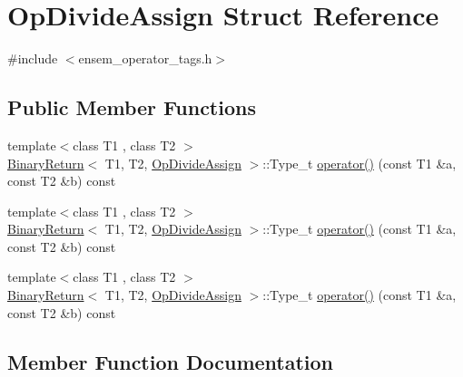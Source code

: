 \hypertarget{structOpDivideAssign}{}\section{Op\+Divide\+Assign Struct Reference}
\label{structOpDivideAssign}


{\ttfamily \#include $<$ensem\+\_\+operator\+\_\+tags.\+h$>$}

\subsection*{Public Member Functions}
\begin{DoxyCompactItemize}
\item 
{\footnotesize template$<$class T1 , class T2 $>$ }\\\mbox{\hyperlink{structBinaryReturn}{Binary\+Return}}$<$ T1, T2, \mbox{\hyperlink{structOpDivideAssign}{Op\+Divide\+Assign}} $>$\+::Type\+\_\+t \mbox{\hyperlink{structOpDivideAssign_a805531d103a9b37b9eb9ff4debaf5e41}{operator()}} (const T1 \&a, const T2 \&b) const
\item 
{\footnotesize template$<$class T1 , class T2 $>$ }\\\mbox{\hyperlink{structBinaryReturn}{Binary\+Return}}$<$ T1, T2, \mbox{\hyperlink{structOpDivideAssign}{Op\+Divide\+Assign}} $>$\+::Type\+\_\+t \mbox{\hyperlink{structOpDivideAssign_a805531d103a9b37b9eb9ff4debaf5e41}{operator()}} (const T1 \&a, const T2 \&b) const
\item 
{\footnotesize template$<$class T1 , class T2 $>$ }\\\mbox{\hyperlink{structBinaryReturn}{Binary\+Return}}$<$ T1, T2, \mbox{\hyperlink{structOpDivideAssign}{Op\+Divide\+Assign}} $>$\+::Type\+\_\+t \mbox{\hyperlink{structOpDivideAssign_a805531d103a9b37b9eb9ff4debaf5e41}{operator()}} (const T1 \&a, const T2 \&b) const
\end{DoxyCompactItemize}


\subsection{Member Function Documentation}
\mbox{\label{structOpDivideAssign_a805531d103a9b37b9eb9ff4debaf5e41}} 
